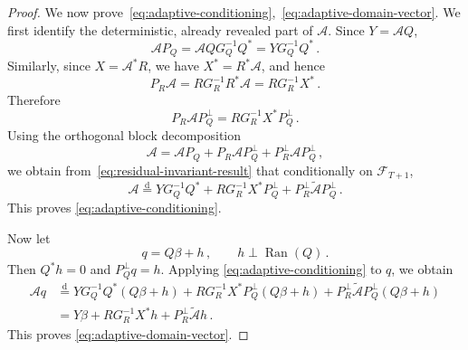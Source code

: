 \documentclass[11pt]{article}
\theoremstyle{definition}
\theoremstyle{remark}
\numberwithin{equation}{section}
\numberwithin{theorem}{section}
\newcommand{\cA}{\mathcal A}
\begin{document}
\begin{proof}
We now prove~\eqref{eq:adaptive-conditioning},~\eqref{eq:adaptive-domain-vector}. We first identify the deterministic, already revealed part of $\cA$. Since $Y=\mathcal A Q$,
\[
  \mathcal A P_Q
  =
  \mathcal A QG_Q^{-1}Q^*
  =
  YG_Q^{-1}Q^*\,.
\]
Similarly, since $X=\mathcal A^*R$, we have $X^*=R^*\mathcal A$, and hence
\[
  P_R\mathcal A
  =
  RG_R^{-1}R^*\mathcal A
  =
  RG_R^{-1}X^*\,.
\]
Therefore
\[
  P_R\mathcal A P_Q^\perp
  =
  RG_R^{-1}X^*P_Q^\perp\,.
\]
Using the orthogonal block decomposition
\[
  \mathcal A
  =
  \mathcal A P_Q
  +
  P_R\mathcal A P_Q^\perp
  +
  P_R^\perp\mathcal A P_Q^\perp\,,
\]
we obtain from~\eqref{eq:residual-invariant-result} that conditionally on $\mathscr F_{T+1}$,
\[
  \mathcal A
  \stackrel{\mathrm d}{=}
  YG_Q^{-1}Q^*
  +
  RG_R^{-1}X^*P_Q^\perp
  +
  P_R^\perp\widetilde{\mathcal A}P_Q^\perp\,.
\]
This proves \eqref{eq:adaptive-conditioning}.

Now let
\[
  q=Q\beta+h\,,
  \qquad
  h\perp\operatorname{Ran}(Q)\,.
\]
Then $Q^*h=0$ and $P_Q^\perp q=h$. Applying \eqref{eq:adaptive-conditioning} to $q$, we obtain
\[
\begin{aligned}
  \mathcal A q
  &\stackrel{\mathrm d}{=}
  YG_Q^{-1}Q^*(Q\beta+h)
  +
  RG_R^{-1}X^*P_Q^\perp(Q\beta+h)
  +
  P_R^\perp\widetilde{\mathcal A}P_Q^\perp(Q\beta+h) \\
  &=
  Y\beta
  +
  RG_R^{-1}X^*h
  +
  P_R^\perp\widetilde{\mathcal A}h\,.
\end{aligned}
\]
This proves \eqref{eq:adaptive-domain-vector}.


\end{proof}
\end{document}
